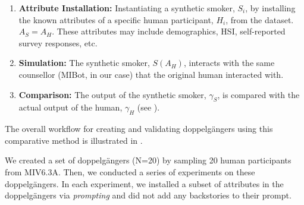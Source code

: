 \begin{enumerate}
	\item \textbf{Attribute Installation:} Instantiating a synthetic smoker, $S_i$, by installing the known attributes of a specific human participant, $H_i$, from the dataset. $A_S = A_H$. These attributes may include demographics, HSI, self-reported survey responses, etc.
	\item \textbf{Simulation:} The synthetic smoker, $S(A_H)$, interacts with the same counsellor (MIBot, in our case) that the original human interacted with.
	\item \textbf{Comparison:} The output of the synthetic smoker, $\gamma_S$, is compared with the actual output of the human, $\gamma_H$ (see ).
\end{enumerate}

The overall workflow for creating and validating doppelgängers using this comparative
method is illustrated in .

We created a set of doppelgängers (N=20) by sampling 20 human participants from
MIV6.3A. Then, we conducted a series of experiments on these doppelgängers. In each
experiment, we installed a subset of attributes in the doppelgängers via
\emph{prompting} and did not add any backstories to their prompt.


